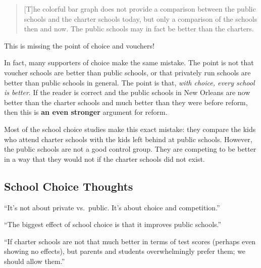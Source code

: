\begin{quote}
    [T]he colorful bar graph does not provide a comparison between the public
    schools and the charter schools today, but only a comparison of the schools
    then and now. The public schools may in fact be better than the charters.
\end{quote}

This is missing the point of choice and vouchers!

In fact, many supporters of choice make the same mistake. The point is not that
voucher schools are better than public schools, or that privately run schools
are better than public schools in general. The point is that, \emph{with
choice, every school is better}. If the reader is correct and the public
schools in New Orleans are now better than the charter schools and much better
than they were before reform, then this is \textbf{an even stronger} argument
for reform.

Most of the school choice studies make this exact mistake: they compare the
kids who attend charter schools with the kids left behind at public schools.
However, the public schools are not a good control group. They are competing to
be better in a way that they would not if the charter schools did not exist.

\subsection{School Choice Thoughts}

``It's not about private vs.\ public. It's about choice and competition.''

``The biggest effect of school choice is that it improves public schools.''

``If charter schools are not that much better in terms of test scores (perhaps
even showing no effects), but parents and students overwhelmingly prefer them;
we should allow them.''

